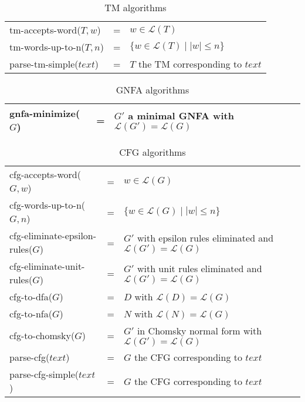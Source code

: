 \documentclass[11pt]{article}
\newcommand*{\Language}[1]{\ensuremath{\mathcal{L}(#1)}}
\begin{document}
\begin{table}[h!]
\begin{tabular}{ |lll| } 
\hline
\textsf{tm-accepts-word}($T,w$) & = & $w \in \Language{T}$ \\
\textsf{tm-words-up-to-n}($T,n$) & = & $\{ w \in \Language{T} \mid |w| \leq n \}$ \\
\textsf{parse-tm-simple}($text$) & = & $T$ the TM corresponding to $text$ \\
\hline
\end{tabular}
\caption{TM algorithms}
\label{table:tm-algorithms}
\end{table}

\begin{table}[h!]
\begin{tabular}{ |lll| } 
\hline
\textsf{gnfa-minimize}($G$) & = & $G'$ a minimal GNFA with $\Language{G'} = \Language{G}$ \\
\hline
\end{tabular}
\caption{GNFA algorithms}
\label{table:gnfa-algorithms}
\end{table}

\begin{table}[h!]
\begin{tabular}{ |lll| } 
\hline
\textsf{cfg-accepts-word}($G,w$) & = & $w \in \Language{G}$ \\
\textsf{cfg-words-up-to-n}($G,n$) & = & $\{ w \in \Language{G} \mid |w| \leq n \}$ \\
\textsf{cfg-eliminate-epsilon-rules}($G$) & = & $G'$ with epsilon rules eliminated and $\Language{G'} = \Language{G}$ \\
\textsf{cfg-eliminate-unit-rules}($G$) & = & $G'$ with unit rules eliminated and $\Language{G'} = \Language{G}$ \\
\textsf{cfg-to-dfa}($G$) & = & $D$ with $\Language{D} = \Language{G}$ \\
\textsf{cfg-to-nfa}($G$) & = & $N$ with $\Language{N} = \Language{G}$ \\
\textsf{cfg-to-chomsky}($G$) & = & $G'$  in Chomsky normal form with $\Language{G'} = \Language{G}$ \\
\textsf{parse-cfg}($text$) & = & $G$ the CFG corresponding to $text$ \\
\textsf{parse-cfg-simple}($text$) & = & $G$ the CFG corresponding to $text$ \\
\hline
\end{tabular}
\caption{CFG algorithms}
\label{table:cfg-algorithms}
\end{table}
\end{document}

